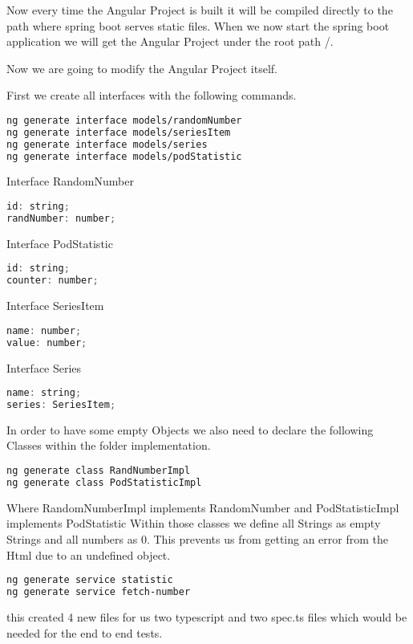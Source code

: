 Now every time the Angular Project is built it will be compiled directly to the path where spring boot serves static files.
When we now start the spring boot application we will get the Angular Project under the root path /.

Now we are going to modify the Angular Project itself.

First we create all interfaces with the following commands.
\begin{lstlisting}[language=Bash]
ng generate interface models/randomNumber
ng generate interface models/seriesItem
ng generate interface models/series
ng generate interface models/podStatistic
\end{lstlisting}

Interface RandomNumber
\begin{lstlisting}[language=Java]
id: string;
randNumber: number;
\end{lstlisting}

Interface PodStatistic
\begin{lstlisting}[language=Java]
id: string;
counter: number;
\end{lstlisting}

Interface SeriesItem
\begin{lstlisting}[language=Java]
name: number;
value: number;
\end{lstlisting}

Interface Series
\begin{lstlisting}[language=Java]
name: string;
series: SeriesItem;
\end{lstlisting}

In order to have some empty Objects we also need to declare the following Classes within the folder implementation.

\begin{lstlisting}[language=Bash]
ng generate class RandNumberImpl
ng generate class PodStatisticImpl
\end{lstlisting}
Where RandomNumberImpl implements RandomNumber and PodStatisticImpl implements PodStatistic
Within those classes we define all Strings as empty Strings and all numbers as 0.
This prevents us from getting an error from the Html due to an undefined object.

\begin{lstlisting}[language=Bash]
ng generate service statistic
ng generate service fetch-number
\end{lstlisting}
this created 4 new files for us two typescript and two spec.ts files which would be needed for the end to end tests.

